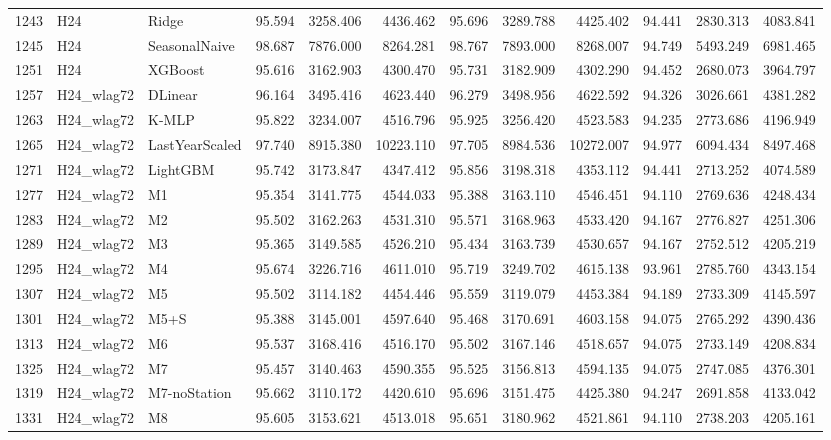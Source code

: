 \begin{tabular}{lllrrrrrrrrr}
1243 & H24 & Ridge & 95.594 & 3258.406 & 4436.462 & 95.696 & 3289.788 & 4425.402 & 94.441 & 2830.313 & 4083.841 \\
1245 & H24 & SeasonalNaive & 98.687 & 7876.000 & 8264.281 & 98.767 & 7893.000 & 8268.007 & 94.749 & 5493.249 & 6981.465 \\
1251 & H24 & XGBoost & 95.616 & 3162.903 & 4300.470 & 95.731 & 3182.909 & 4302.290 & 94.452 & 2680.073 & 3964.797 \\
1257 & H24_wlag72 & DLinear & 96.164 & 3495.416 & 4623.440 & 96.279 & 3498.956 & 4622.592 & 94.326 & 3026.661 & 4381.282 \\
1263 & H24_wlag72 & K-MLP & 95.822 & 3234.007 & 4516.796 & 95.925 & 3256.420 & 4523.583 & 94.235 & 2773.686 & 4196.949 \\
1265 & H24_wlag72 & LastYearScaled & 97.740 & 8915.380 & 10223.110 & 97.705 & 8984.536 & 10272.007 & 94.977 & 6094.434 & 8497.468 \\
1271 & H24_wlag72 & LightGBM & 95.742 & 3173.847 & 4347.412 & 95.856 & 3198.318 & 4353.112 & 94.441 & 2713.252 & 4074.589 \\
1277 & H24_wlag72 & M1 & 95.354 & 3141.775 & 4544.033 & 95.388 & 3163.110 & 4546.451 & 94.110 & 2769.636 & 4248.434 \\
1283 & H24_wlag72 & M2 & 95.502 & 3162.263 & 4531.310 & 95.571 & 3168.963 & 4533.420 & 94.167 & 2776.827 & 4251.306 \\
1289 & H24_wlag72 & M3 & 95.365 & 3149.585 & 4526.210 & 95.434 & 3163.739 & 4530.657 & 94.167 & 2752.512 & 4205.219 \\
1295 & H24_wlag72 & M4 & 95.674 & 3226.716 & 4611.010 & 95.719 & 3249.702 & 4615.138 & 93.961 & 2785.760 & 4343.154 \\
1307 & H24_wlag72 & M5 & 95.502 & 3114.182 & 4454.446 & 95.559 & 3119.079 & 4453.384 & 94.189 & 2733.309 & 4145.597 \\
1301 & H24_wlag72 & M5+S & 95.388 & 3145.001 & 4597.640 & 95.468 & 3170.691 & 4603.158 & 94.075 & 2765.292 & 4390.436 \\
1313 & H24_wlag72 & M6 & 95.537 & 3168.416 & 4516.170 & 95.502 & 3167.146 & 4518.657 & 94.075 & 2733.149 & 4208.834 \\
1325 & H24_wlag72 & M7 & 95.457 & 3140.463 & 4590.355 & 95.525 & 3156.813 & 4594.135 & 94.075 & 2747.085 & 4376.301 \\
1319 & H24_wlag72 & M7-noStation & 95.662 & 3110.172 & 4420.610 & 95.696 & 3151.475 & 4425.380 & 94.247 & 2691.858 & 4133.042 \\
1331 & H24_wlag72 & M8 & 95.605 & 3153.621 & 4513.018 & 95.651 & 3180.962 & 4521.861 & 94.110 & 2738.203 & 4205.161 \\

\end{tabular}

